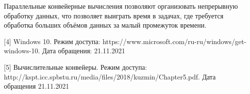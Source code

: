 \documentclass[12pt]{report}
\begin{document}
Параллельные конвейерные вычисления позволяют организовать непрерывную обработку данных, что позволяет выиграть время в задачах, где требуется обработка больших объёмов данных за малый промежуток времени.

[4] Windows 10. Режим доступа: https://www.microsoft.com/ru-ru/windows/get-windows-10. Дата обращения: 21.11.2021

[5] Вычислительные конвейеры. Режим доступа: http://kspt.icc.spbstu.ru/media/files/2018/kuzmin/Chapter5.pdf. Дата обращения 21.11.2021
\end{document}
